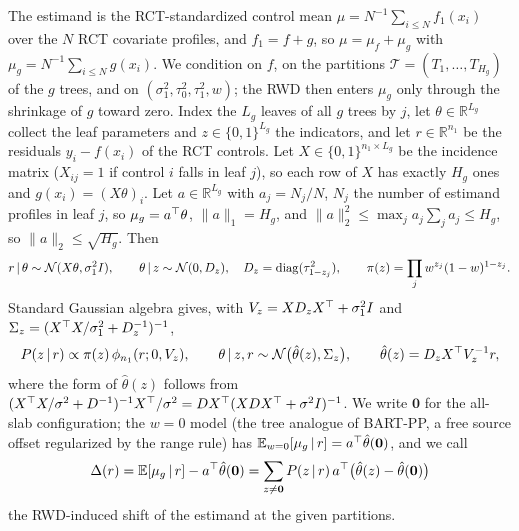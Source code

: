 The estimand is the RCT-standardized control mean $\mu=N^{-1}\sum_{i\le N}f_1(x_i)$ over the $N$ RCT covariate profiles, and $f_1=f+g$, so $\mu=\mu_f+\mu_g$ with $\mu_g=N^{-1}\sum_{i\le N}g(x_i)$. We condition on $f$, on the partitions $\mathcal T=(T_1,\dots,T_{H_g})$ of the $g$ trees, and on $(\sigma_1^2,\tau_0^2,\tau_1^2,w)$; the RWD then enters $\mu_g$ only through the shrinkage of $g$ toward zero. Index the $L_g$ leaves of all $g$ trees by $j$, let $\theta\in\mathbb R^{L_g}$ collect the leaf parameters and $z\in\{0,1\}^{L_g}$ the indicators, and let $r\in\mathbb R^{n_1}$ be the residuals $y_i-f(x_i)$ of the RCT controls. Let $X\in\{0,1\}^{n_1\times L_g}$ be the incidence matrix ($X_{ij}=1$ if control $i$ falls in leaf $j$), so each row of $X$ has exactly $H_g$ ones and $g(x_i)=(X\theta)_i$. Let $a\in\mathbb R^{L_g}$ with $a_j=N_j/N$, $N_j$ the number of estimand profiles in leaf $j$, so $\mu_g=a^{\top}\theta$, $\|a\|_1=H_g$, and $\|a\|_2^2\le\max_ja_j\sum_ja_j\le H_g$, so $\|a\|_2\le\sqrt{H_g}$. Then
\begin{equation}
r\,\vert\,\theta\sim\mathcal{N}(X\theta,\sigma_1^2I),\qquad \theta\,\vert\, z\sim\mathcal{N}(0,D_z),\quad D_z=\mathrm{diag}(\tau^2_{1-z_j}),\qquad \pi(z)=\prod_jw^{z_j}(1-w)^{1-z_j}.
\label{eq:linform}
\end{equation}
Standard Gaussian algebra gives, with $V_z=XD_zX^{\top}+\sigma_1^2I$ and $\Sigma_z=(X^{\top} X/\sigma_1^2+D_z^{-1})^{-1}$,
\begin{equation}
P(z\,\vert\, r)\propto\pi(z)\,\phi_{n_1}(r;0,V_z),\qquad
\theta\,\vert\, z,r\sim\mathcal{N}\bigl(\hat\theta(z),\Sigma_z\bigr),\qquad \hat\theta(z)=D_zX^{\top} V_z^{-1}r,
\label{eqA:zpost}
\end{equation}
where the form of $\hat\theta(z)$ follows from $(X^{\top} X/\sigma^2+D^{-1})^{-1}X^{\top}/\sigma^2=DX^{\top}(XDX^{\top}+\sigma^2I)^{-1}$. We write $\mathbf 0$ for the all-slab configuration; the $w=0$ model (the tree analogue of BART-PP, a free source offset regularized by the range rule) has $\mathbb{E}_{w=0}[\mu_g\,\vert\, r]=a^{\top}\hat\theta(\mathbf 0)$, and we call
\begin{equation}
\Delta(r)=\mathbb{E}[\mu_g\,\vert\, r]-a^{\top}\hat\theta(\mathbf 0)=\sum_{z\ne\mathbf 0}P(z\,\vert\, r)\,a^{\top}\bigl(\hat\theta(z)-\hat\theta(\mathbf 0)\bigr)
\label{eq:Delta}
\end{equation}
the RWD-induced shift of the estimand at the given partitions.

